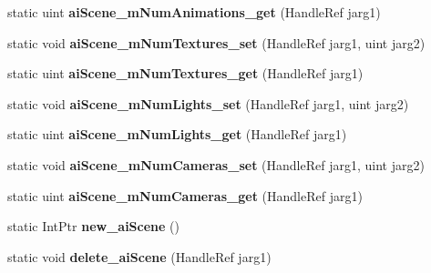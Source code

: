 \begin{DoxyCompactItemize}
\item 
\hypertarget{class_assimp_p_i_n_v_o_k_e_a9364214c057478c9fe8cb9a1595d716d}{static uint {\bfseries ai\+Scene\+\_\+m\+Num\+Animations\+\_\+get} (Handle\+Ref jarg1)}\label{class_assimp_p_i_n_v_o_k_e_a9364214c057478c9fe8cb9a1595d716d}

\item 
\hypertarget{class_assimp_p_i_n_v_o_k_e_aaf957b47a92b1540ff6f8f2ce5aa84ab}{static void {\bfseries ai\+Scene\+\_\+m\+Num\+Textures\+\_\+set} (Handle\+Ref jarg1, uint jarg2)}\label{class_assimp_p_i_n_v_o_k_e_aaf957b47a92b1540ff6f8f2ce5aa84ab}

\item 
\hypertarget{class_assimp_p_i_n_v_o_k_e_a731367a9778459a492178e4467fb302c}{static uint {\bfseries ai\+Scene\+\_\+m\+Num\+Textures\+\_\+get} (Handle\+Ref jarg1)}\label{class_assimp_p_i_n_v_o_k_e_a731367a9778459a492178e4467fb302c}

\item 
\hypertarget{class_assimp_p_i_n_v_o_k_e_a16676112048e96537eb3ff84de26d193}{static void {\bfseries ai\+Scene\+\_\+m\+Num\+Lights\+\_\+set} (Handle\+Ref jarg1, uint jarg2)}\label{class_assimp_p_i_n_v_o_k_e_a16676112048e96537eb3ff84de26d193}

\item 
\hypertarget{class_assimp_p_i_n_v_o_k_e_a8dca160056040343d1cc356a4e58da25}{static uint {\bfseries ai\+Scene\+\_\+m\+Num\+Lights\+\_\+get} (Handle\+Ref jarg1)}\label{class_assimp_p_i_n_v_o_k_e_a8dca160056040343d1cc356a4e58da25}

\item 
\hypertarget{class_assimp_p_i_n_v_o_k_e_adeba16dccf55f7f871110b102eca1a8c}{static void {\bfseries ai\+Scene\+\_\+m\+Num\+Cameras\+\_\+set} (Handle\+Ref jarg1, uint jarg2)}\label{class_assimp_p_i_n_v_o_k_e_adeba16dccf55f7f871110b102eca1a8c}

\item 
\hypertarget{class_assimp_p_i_n_v_o_k_e_a13197396f37dbabe36959e89df32cb66}{static uint {\bfseries ai\+Scene\+\_\+m\+Num\+Cameras\+\_\+get} (Handle\+Ref jarg1)}\label{class_assimp_p_i_n_v_o_k_e_a13197396f37dbabe36959e89df32cb66}

\item 
\hypertarget{class_assimp_p_i_n_v_o_k_e_a4f964b7327620226bd6922312082bd7c}{static Int\+Ptr {\bfseries new\+\_\+ai\+Scene} ()}\label{class_assimp_p_i_n_v_o_k_e_a4f964b7327620226bd6922312082bd7c}

\item 
\hypertarget{class_assimp_p_i_n_v_o_k_e_ae2c897b6a714af13c56d8c3c753e1b6c}{static void {\bfseries delete\+\_\+ai\+Scene} (Handle\+Ref jarg1)}\label{class_assimp_p_i_n_v_o_k_e_ae2c897b6a714af13c56d8c3c753e1b6c}


\end{DoxyCompactItemize}
